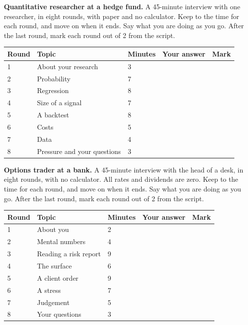\begin{question}\label{iq:iv2:mock-interviews:2}
\textbf{Quantitative researcher at a hedge fund.} A 45-minute interview with one researcher, in eight rounds, with paper and no calculator. Keep to the time for each round, and move on when it ends. Say what you are doing as you go. After the last round, mark each round out of 2 from the script.

\medskip
\begin{tabular}{@{}l|l|l|l|l@{}}
Round & Topic & Minutes & Your answer & Mark \\ \hline
1 & About your research & 3 & & \\[6pt]\hline
2 & Probability & 7 & & \\[6pt]\hline
3 & Regression & 8 & & \\[6pt]\hline
4 & Size of a signal & 7 & & \\[6pt]\hline
5 & A backtest & 8 & & \\[6pt]\hline
6 & Costs & 5 & & \\[6pt]\hline
7 & Data & 4 & & \\[6pt]\hline
8 & Pressure and your questions & 3 & & \\[6pt]\hline
\end{tabular}
\end{question}

\vfill\clearpage
\begin{question}\label{iq:iv2:mock-interviews:3}
\textbf{Options trader at a bank.} A 45-minute interview with the head of a desk, in eight rounds, with no calculator. All rates and dividends are zero. Keep to the time for each round, and move on when it ends. Say what you are doing as you go. After the last round, mark each round out of 2 from the script.

\medskip
\begin{tabular}{@{}l|l|l|l|l@{}}
Round & Topic & Minutes & Your answer & Mark \\ \hline
1 & About you & 2 & & \\[6pt]\hline
2 & Mental numbers & 4 & & \\[6pt]\hline
3 & Reading a risk report & 9 & & \\[6pt]\hline
4 & The surface & 6 & & \\[6pt]\hline
5 & A client order & 9 & & \\[6pt]\hline
6 & A stress & 7 & & \\[6pt]\hline
7 & Judgement & 5 & & \\[6pt]\hline
8 & Your questions & 3 & & \\[6pt]\hline
\end{tabular}
\end{question}

